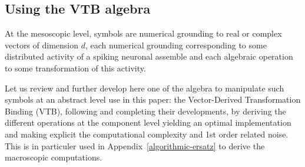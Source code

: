 \documentclass[sn-mathphys]{sn-jnl}
\begin{document}
\begin{appendices}

\section{Using the VTB algebra} \label{VTB-algebra}

At the mesoscopic level, symbols are numerical grounding to real or complex vectors of dimension $d$, each numerical grounding corresponding to some distributed activity of a spiking neuronal assemble and each algebraic operation to some transformation of this activity.

Let us review and further develop here one of the algebra to manipulate such symbols at an abstract level use in this paper: the Vector-Derived Transformation Binding (VTB), following \cite{gosmann_vector-derived_2019} and completing their developments, by deriving the different operations at the component level yielding an optimal implementation and making explicit the computational complexity and 1st order related noise. This is in particuler used in Appendix~\ref{algorithmic-ersatz} to derive the macroscopic computations.


\end{appendices}
\end{document}
